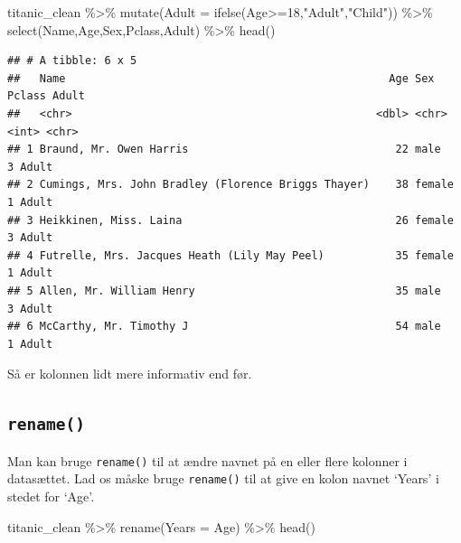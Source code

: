 \documentclass[
]{book}
\newenvironment{Shaded}{\begin{snugshade}}{\end{snugshade}}
\newcommand{\AttributeTok}[1]{\textcolor[rgb]{0.77,0.63,0.00}{#1}}
\newcommand{\DecValTok}[1]{\textcolor[rgb]{0.00,0.00,0.81}{#1}}
\newcommand{\FunctionTok}[1]{\textcolor[rgb]{0.00,0.00,0.00}{#1}}
\newcommand{\NormalTok}[1]{#1}
\newcommand{\SpecialCharTok}[1]{\textcolor[rgb]{0.00,0.00,0.00}{#1}}
\newcommand{\StringTok}[1]{\textcolor[rgb]{0.31,0.60,0.02}{#1}}
\begin{document}
\begin{Shaded}
\begin{Highlighting}[]
\NormalTok{titanic\_clean }\SpecialCharTok{\%\textgreater{}\%} 
    \FunctionTok{mutate}\NormalTok{(}\AttributeTok{Adult =} \FunctionTok{ifelse}\NormalTok{(Age}\SpecialCharTok{\textgreater{}=}\DecValTok{18}\NormalTok{,}\StringTok{"Adult"}\NormalTok{,}\StringTok{"Child"}\NormalTok{)) }\SpecialCharTok{\%\textgreater{}\%}
    \FunctionTok{select}\NormalTok{(Name,Age,Sex,Pclass,Adult) }\SpecialCharTok{\%\textgreater{}\%}
    \FunctionTok{head}\NormalTok{()}
\end{Highlighting}
\end{Shaded}

\begin{verbatim}
## # A tibble: 6 x 5
##   Name                                                  Age Sex    Pclass Adult
##   <chr>                                               <dbl> <chr>   <int> <chr>
## 1 Braund, Mr. Owen Harris                                22 male        3 Adult
## 2 Cumings, Mrs. John Bradley (Florence Briggs Thayer)    38 female      1 Adult
## 3 Heikkinen, Miss. Laina                                 26 female      3 Adult
## 4 Futrelle, Mrs. Jacques Heath (Lily May Peel)           35 female      1 Adult
## 5 Allen, Mr. William Henry                               35 male        3 Adult
## 6 McCarthy, Mr. Timothy J                                54 male        1 Adult
\end{verbatim}

Så er kolonnen lidt mere informativ end før.

\hypertarget{rename}{%
\subsection{\texorpdfstring{\texttt{rename()}}{rename()}}\label{rename}}

Man kan bruge \texttt{rename()} til at ændre navnet på en eller flere kolonner i datasættet. Lad os måske bruge \texttt{rename()} til at give en kolon navnet `Years' i stedet for `Age'.

\begin{Shaded}
\begin{Highlighting}[]
\NormalTok{titanic\_clean }\SpecialCharTok{\%\textgreater{}\%}
  \FunctionTok{rename}\NormalTok{(}\AttributeTok{Years =}\NormalTok{ Age) }\SpecialCharTok{\%\textgreater{}\%}
  \FunctionTok{head}\NormalTok{()}
\end{Highlighting}
\end{Shaded}
\end{document}
